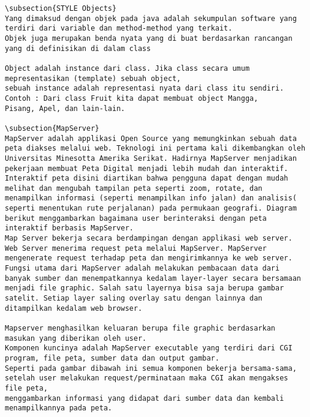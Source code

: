 \begin{verbatim}
\subsection{STYLE Objects}
Yang dimaksud dengan objek pada java adalah sekumpulan software yang terdiri dari variable dan method-method yang terkait. 
Objek juga merupakan benda nyata yang di buat berdasarkan rancangan yang di definisikan di dalam class

Object adalah instance dari class. Jika class secara umum mepresentasikan (template) sebuah object, 
sebuah instance adalah representasi nyata dari class itu sendiri. Contoh : Dari class Fruit kita dapat membuat object Mangga, 
Pisang, Apel, dan lain-lain.

\subsection{MapServer}
MapServer adalah applikasi Open Source yang memungkinkan sebuah data peta diakses melalui web. Teknologi ini pertama kali dikembangkan oleh Universitas Minesotta Amerika Serikat. Hadirnya MapServer menjadikan pekerjaan membuat Peta Digital menjadi lebih mudah dan interaktif. Interaktif peta disini diartikan bahwa pengguna dapat dengan mudah melihat dan mengubah tampilan peta seperti zoom, rotate, dan menampilkan informasi (seperti menampilkan info jalan) dan analisis( seperti menentukan rute perjalanan) pada permukaan geografi. Diagram berikut menggambarkan bagaimana user berinteraksi dengan peta interaktif berbasis MapServer.
Map Server bekerja secara berdampingan dengan applikasi web server. Web Server menerima request peta melalui MapServer. MapServer mengenerate request terhadap peta dan mengirimkannya ke web server. Fungsi utama dari MapServer adalah melakukan pembacaan data dari banyak sumber dan menempatkannya kedalam layer-layer secara bersamaan menjadi file graphic. Salah satu layernya bisa saja berupa gambar satelit. Setiap layer saling overlay satu dengan lainnya dan ditampilkan kedalam web browser.

Mapserver menghasilkan keluaran berupa file graphic berdasarkan masukan yang diberikan oleh user. 
Komponen kuncinya adalah MapServer executable yang terdiri dari CGI program, file peta, sumber data dan output gambar. 
Seperti pada gambar dibawah ini semua komponen bekerja bersama-sama, 
setelah user melakukan request/perminataan maka CGI akan mengakses file peta, 
menggambarkan informasi yang didapat dari sumber data dan kembali menampilkannya pada peta.


\end{verbatim}
